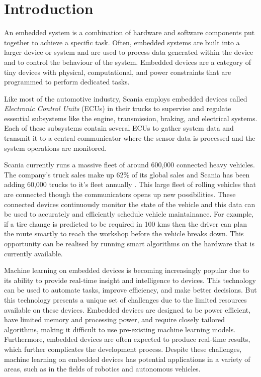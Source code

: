 \part{Introduction}

An embedded system is a combination of hardware and software components put together to achieve a specific task. Often, embedded systems are built into a larger device or system and are used to process data generated within the device and to control the behaviour of the system. Embedded devices are a category of tiny devices with physical, computational, and power constraints that are programmed to perform dedicated tasks.

Like most of the automotive industry, Scania employs embedded devices called \textit{Electronic Control Units} (ECUs) in their trucks to supervise and regulate essential subsystems like the engine, transmission, braking, and electrical systems. Each of these subsystems contain several ECUs to gather system data and transmit it to a central communicator where the sensor data is processed and the system operations are monitored.

Scania currently runs a massive fleet of around 600,000 connected heavy vehicles. The company's truck sales make up 62\% of its global sales and Scania has been adding 60,000 trucks to it's fleet annually \cite{scania-report}. This large fleet of rolling vehicles that are connected though the communicators opens up new possibilities. These connected devices continuously monitor the state of the vehicle and this data can be used to accurately and efficiently schedule vehicle maintainance. For example, if a tire change is predicted to be required in 100 kms then the driver can plan the route smartly to reach the workshop before the vehicle breaks down. This opportunity can be realised by running smart algorithms on the hardware that is currently available.

Machine learning on embedded devices is becoming increasingly popular due to its ability to provide real-time insight and intelligence to devices. This technology can be used to automate tasks, improve efficiency, and make better decisions. But this technology presents a unique set of challenges due to the limited resources available on these devices. Embedded devices are designed to be power efficient, have limited memory and processing power, and require closely tailored algorithms, making it difficult to use pre-existing machine learning models. Furthermore, embedded devices are often expected to produce real-time results, which further complicates the development process. Despite these challenges, machine learning on embedded devices has potential applications in a variety of areas, such as in the fields of robotics and autonomous vehicles.

